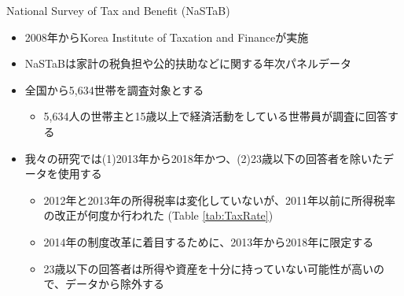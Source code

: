 \documentclass[
  ignorenonframetext,
  aspectratio=169,
]{beamer}
\providecommand{\tightlist}{%
  \setlength{\itemsep}{0pt}\setlength{\parskip}{0pt}}
\begin{document}
\begin{frame}{National Survey of Tax and Benefit (NaSTaB)}
\protect\hypertarget{national-survey-of-tax-and-benefit-nastab}{}
\begin{itemize}
\tightlist
\item
  2008年からKorea Institute of Taxation and Financeが実施
\item
  NaSTaBは家計の税負担や公的扶助などに関する年次パネルデータ
\item
  全国から5,634世帯を調査対象とする

  \begin{itemize}
  \tightlist
  \item
    5,634人の世帯主と15歳以上で経済活動をしている世帯員が調査に回答する
  \end{itemize}
\item
  我々の研究では(1)2013年から2018年かつ、(2)23歳以下の回答者を除いたデータを使用する

  \begin{itemize}
  \tightlist
  \item
    2012年と2013年の所得税率は変化していないが、2011年以前に所得税率の改正が何度か行われた (Table \ref{tab:TaxRate})
  \item
    2014年の制度改革に着目するために、2013年から2018年に限定する
  \item
    23歳以下の回答者は所得や資産を十分に持っていない可能性が高いので、データから除外する
  \end{itemize}
\end{itemize}
\end{frame}
\end{document}
